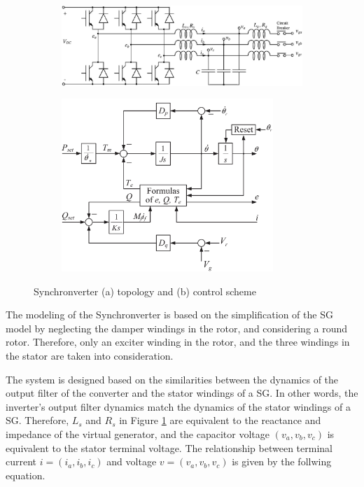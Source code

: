 \begin{figure}[ht!]
    \centering
    \begin{subfigure}[b]{\textwidth}
        \centering
        \includegraphics[width=12cm]{images/synchronverter_topology.png}
        \caption{}
        \label{fig:synchronverter_topology}
    \end{subfigure}

    \begin{subfigure}[b]{\textwidth}
        \centering
        \includegraphics[width=8cm]{images/synchronverter_control.png}
        \caption{}
        \label{fig:synchronverter_control}
    \end{subfigure}
    \label{fig:synchronverter}
    \caption{Synchronverter (a) topology and (b) control scheme \cite{zhong2014self}}
\end{figure}

The modeling of the Synchronverter is based on the simplification of the SG
model by neglecting the damper windings in the rotor, and considering a round
rotor. Therefore, only an exciter winding in the rotor, and the three windings
in the stator are taken into consideration.

The system is designed based on the similarities between the dynamics of the
output filter of the converter and the stator windings of a SG. In other words,
the inverter's output filter dynamics match the dynamics of the stator windings
of a SG. Therefore, $L_s$ and $R_s$ in Figure \ref{fig:synchronverter_topology}
are equivalent to the reactance and impedance of the virtual generator, and the
capacitor voltage $(v_a, v_b, v_c)$ is equivalent to the stator terminal
voltage. The relationship between terminal current $i = (i_a, i_b, i_c)$ and
voltage $v = (v_a, v_b, v_c)$ is given by the follwing equation.

